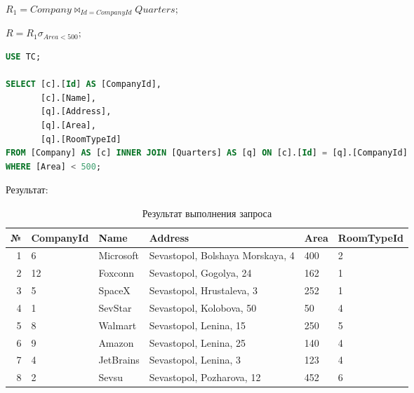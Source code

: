 \documentclass[a4paper,14pt]{extarticle}
\begin{document}
$R_{1} = Company \bowtie_{Id = CompanyId} Quarters;$

$R = R_{1} \sigma _{Area < 500};$

\begin{lstlisting}[language=SQL]
USE TC;

SELECT [c].[Id] AS [CompanyId], 
	   [c].[Name], 
	   [q].[Address],
	   [q].[Area],
	   [q].[RoomTypeId]
FROM [Company] AS [c] INNER JOIN [Quarters] AS [q] ON [c].[Id] = [q].[CompanyId]
WHERE [Area] < 500;
\end{lstlisting}

Результат:
\begin{table}[H]
    \caption{Результат выполнения запроса}
    \noindent\begin{tabular}{|r|l|l|l|l|l|}
        \hline
        № & CompanyId & Name	  & Address	                         & Area & RoomTypeId \\ \hline
        1 & 6         & Microsoft & Sevastopol, Bolshaya Morskaya, 4 & 400  & 2          \\ \hline
        2 & 12        & Foxconn   & Sevastopol, Gogolya, 24          & 162  & 1          \\ \hline
        3 & 5         & SpaceX    & Sevastopol, Hrustaleva, 3        & 252  & 1          \\ \hline
        4 & 1         & SevStar   & Sevastopol, Kolobova, 50         & 50   & 4          \\ \hline
        5 & 8         & Walmart   & Sevastopol, Lenina, 15           & 250  & 5          \\ \hline
        6 & 9         & Amazon	  & Sevastopol, Lenina, 25           & 140  & 4          \\ \hline
        7 & 4         & JetBrains & Sevastopol, Lenina, 3            & 123  & 4          \\ \hline
        8 & 2         & Sevsu	  & Sevastopol, Pozharova, 12        & 452  & 6          \\ \hline
    \end{tabular}
\end{table}
\end{document}
